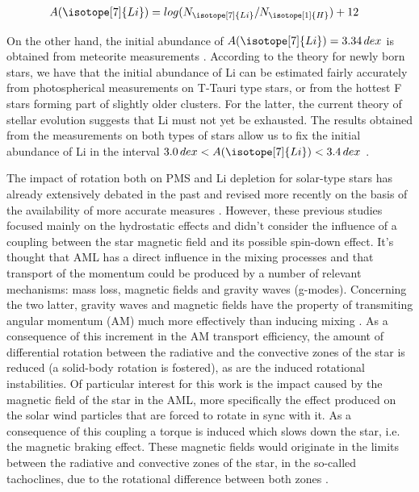 \documentclass[fleqn,usenatbib]{mnras}
\begin{document}
\begin{ceqn}
\begin{align}
    A(\isotope[7]{Li}) &= log(N_{\isotope[7]{Li}} / N_{\isotope[1]{H}}) + 12
    \label{eq:A_Li}
\end{align}
\end{ceqn}

On the other hand, the initial abundance of $A(\isotope[7]{Li}) = 3.34 \, dex$ is obtained from meteorite measurements \citep{Randich2006}. According to the theory for newly born stars, we have that the initial abundance of Li can be estimated fairly accurately from photospherical measurements on T-Tauri type stars, or from the hottest F stars forming part of slightly older clusters. For the latter, the current theory of stellar evolution suggests that Li must not yet be exhausted. The results obtained from the measurements on both types of stars allow us to fix the initial abundance of Li in the interval $3.0 \, dex < A(\isotope[7]{Li}) < 3.4 \, dex$ \citep{Randich2006}.\par

The impact of rotation both on PMS and Li depletion for solar-type stars has already extensively debated in the past \citep{Pinsonneault1997,Jeffries2004,Somers2014} and revised more recently on the basis of the availability of more accurate measures \citep{Bouvier2016}. However, these previous studies focused mainly on the hydrostatic effects and didn't consider the influence of a coupling between the star magnetic field and its possible spin-down effect. It's thought that AML has a direct influence in the mixing processes and that transport of the momentum could be produced by a number of relevant mechanisms: mass loss, magnetic fields and gravity waves (g-modes). Concerning the two latter, gravity waves \citep{Charbonnel2005} and magnetic fields \citep{Eggenberger2009} have the property of transmiting angular momentum (AM) much more effectively than inducing mixing \citep{Denissenkov2007}. As a consequence of this increment in the AM transport efficiency, the amount of differential rotation between the radiative and the convective zones of the star is reduced (a solid-body rotation is fostered), as are the induced rotational instabilities. Of particular interest for this work is the impact caused by the magnetic field of the star in the AML, more specifically the effect produced on the solar wind particles that are forced to rotate in sync with it. As a consequence of this coupling a torque is induced which slows down the star, i.e. the magnetic braking effect. These magnetic fields would originate in the limits between the radiative and convective zones of the star, in the so-called tachoclines, due to the rotational difference between both zones \citep{Guerrero2016}. \par
\end{document}
